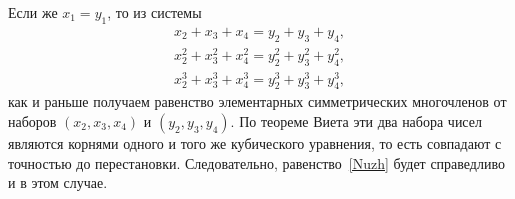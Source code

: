 Если же $x_1 = y_1$, то из системы
\begin{gather*}
    x_2 + x_3 + x_4 = y_2 + y_3 + y_4
,\\
    x_2^2 + x_3^2 + x_4^2 = y_2^2 + y_3^2 + y_4^2
,\\
    x_2^3 + x_3^3 + x_4^3 = y_2^3 + y_3^3 + y_4^3
,\end{gather*}
как и раньше получаем равенство элементарных симметрических многочленов от
наборов $(x_2, x_3, x_4)$ и $(y_2, y_3, y_4)$.
По теореме Виета эти два набора чисел являются корнями одного и того же
кубического уравнения, то есть совпадают с точностью до перестановки.
Следовательно, равенство~\eqref{Nuzh} будет справедливо и в этом случае.
\endproblem
